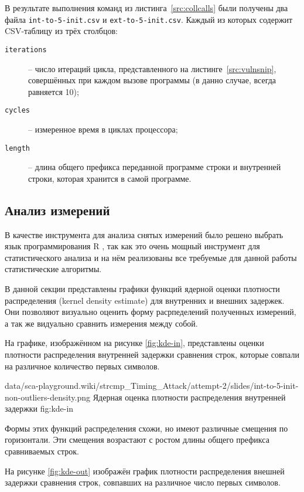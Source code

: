 В результате выполнения команд из листинга~\ref{src:collcalls} были получены два файла
\texttt{int-to-5-init.csv} и \texttt{ext-to-5-init.csv}. Каждый из которых содержит CSV-таблицу
из трёх столбцов:

\begin{description}
\item [\texttt{iterations}] -- число итераций цикла, представленного на
  листинге~\ref{src:vulnsnip}, совершённых при каждом вызове программы 
  (в данно случае, всегда равняется 10);
\item [\texttt{cycles}] -- измеренное время в циклах процессора;
\item [\texttt{length}] -- длина общего префикса переданной программе  строки и
  внутренней строки, которая хранится в самой программе.
\end{description}

\subsection{Анализ измерений}

В качестве инструмента для анализа снятых измерений было решено выбрать язык программирования
R \cite{r}, так как это очень мощный инструмент для статистического анализа и на нём реализованы
все требуемые для данной работы статистические алгоритмы.

В данной секции представлены графики функций ядерной оценки плотности
распределения (kernel density estimate) для внутренних и внешних задержек.
Они позволяют визуально оценить форму расрпеделений полученных измерений, а так же
видуально сравнить измерения между собой.

На графике, изображённом на рисунке \ref{fig:kde-in}, представлены оценки плотности распределения
внутренней задержки сравнения строк, которые совпали на различное количество
первых символов.

\nopagebreak

\addimghere
{data/sca-playground.wiki/strcmp_Timing_Attack/attempt-2/slides/int-to-5-init-non-outliers-density.png}{}
{Ядерная оценка плотности распределения внутренней задержки}
{fig:kde-in}

Формы этих функций распределения схожи, но имеют различные
смещения по горизонтали. Эти смещения возрастают с ростом длины общего префикса
сравниваемых строк.

На рисунке \ref{fig:kde-out} изображён график плотности распределения внешней задержки
сравнения строк, совпавших на различное число первых символов.

